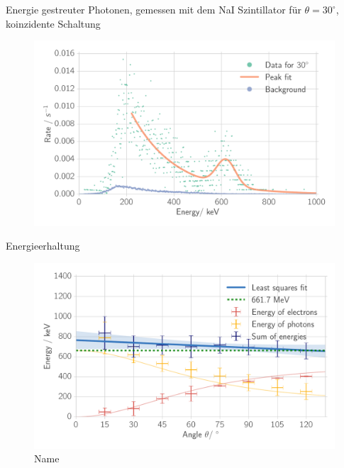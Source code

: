 \documentclass[xcolor=x11names,compress]{beamer}
\renewcommand{\(}{\begin{columns}}
\renewcommand{\)}{\end{columns}}
\newcommand{\<}[1]{\begin{column}{#1}}
\renewcommand{\>}{\end{column}}
\begin{document}
\begin{frame}[t]{Energie gestreuter Photonen, gemessen mit dem NaI Szintillator für 
    $\theta = 30^\circ$, koinzidente Schaltung}
\begin{figure}[htpb]
    \centering
    \includegraphics[width=1.0\linewidth]{../analysis/figures/coin_na_30}
    \label{fig:coin_na_30}
\end{figure}
\end{frame}

\begin{frame}[t]{Energieerhaltung}
   \begin{figure}[htpb]
       \centering
       \includegraphics[width=0.9\linewidth]{../analysis/figures/energy_conservation}
       \caption{Name}
       \label{fig:name}
   \end{figure} 
\end{frame}
\end{document}
